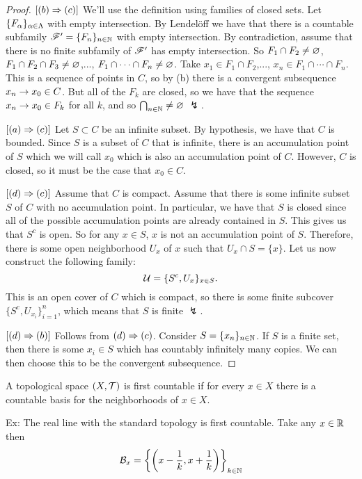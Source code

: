 \begin{proof}
$[(b) \Rightarrow (c)]$ We'll use the definition using families of closed sets. Let $\{F_\alpha\}_{\alpha\in \Lambda}$ with empty intersection. By Lendel\"off we have that there is a countable subfamily $\mathscr{F}^\prime = \{F_n\}_{n\in \mathbb{N}}$ with empty intersection. By contradiction, assume that there is no finite subfamily of $\mathscr{F}^\prime$ has empty intersection. So $F_1\cap F_2 \neq \varnothing$, $F_1\cap F_2\cap F_3 \neq \varnothing$,..., $F_1\cap \cdots\cap F_n\neq \varnothing$. Take $x_1\in F_1\cap F_2$,..., $x_n\in F_1\cap \cdots\cap F_n$. This is a sequence of points in $C$, so by (b) there is a convergent subsequence $x_n\rightarrow x_0\in C$. But all of the $F_k$ are closed, so we have that the sequence $x_n\rightarrow x_0\in F_k$ for all $k$, and so $\bigcap_{n\in \mathbb{N}}\neq \varnothing$ $\lightning$.

$[(a)\Rightarrow (c)]$ Let $S\subset C$ be an infinite subset. By hypothesis, we have that $C$ is bounded. Since $S$ is a subset of $C$ that is infinite, there is an accumulation point of $S$ which we will call $x_0$ which is also an accumulation point of $C$. However, $C$ is closed, so it must be the case that $x_0\in C$.  

$[(d) \Rightarrow (c)]$ Assume that $C$ is compact. Assume that there is some infinite subset $S$ of $C$ with no accumulation point. In particular, we have that $S$ is closed since all of the possible accumulation points are already contained in $S$. This gives us that $S^c$ is open. So for any $x\in S$, $x$ is not an accumulation point of $S$. Therefore, there is some open neighborhood $U_x$ of $x$ such that $U_x\cap S = \{x\}$. Let us now construct the following family:
\[\mathcal{U} = \{S^c, U_x\}_{x\in S}.\]
This is an open cover of $C$ which is compact, so there is some finite subcover $\{S^c, U_{x_i}\}_{i = 1}^n$, which means that $S$ is finite $\lightning$.

$[(d)\Rightarrow (b)]$ Follows from $(d) \Rightarrow (c)$. Consider $S = \{x_n\}_{n\in \mathbb{N}}$. If $S$ is a finite set, then there is some $x_i\in S$ which has countably infinitely many copies. We can then choose this to be the convergent subsequence.
\end{proof}

\dfn A topological space $(X, \mathcal{T})$ is first countable if for every $x\in X$ there is a countable basis for the neighborhoods of $x\in X$.

Ex: The real line with the standard topology is first countable. Take any $x\in \mathbb{R}$ then
\[\mathcal{B}_x = \left\{\left( x -\frac{1}{k}, x + \frac{1}{k}\right)\right\}_{k\in \mathbb{N}}\]


